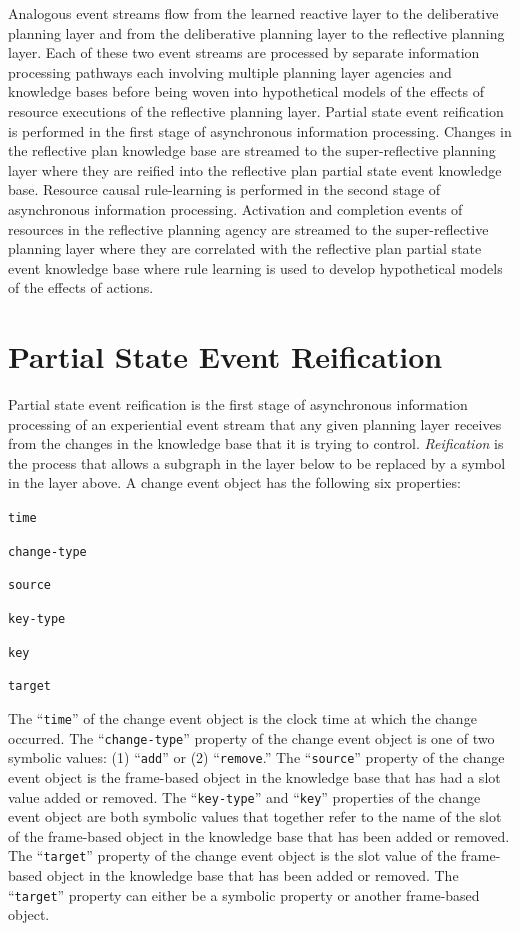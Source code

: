 Analogous event streams flow from the learned reactive layer to the
deliberative planning layer and from the deliberative planning layer
to the reflective planning layer.  Each of these two event streams are
processed by separate information processing pathways each involving
multiple planning layer agencies and knowledge bases before being
woven into hypothetical models of the effects of resource executions
of the reflective planning layer.  Partial state event reification is
performed in the first stage of asynchronous information processing.
Changes in the reflective plan knowledge base are streamed to the
super-reflective planning layer where they are reified into the
reflective plan partial state event knowledge base.  Resource causal
rule-learning is performed in the second stage of asynchronous
information processing.  Activation and completion events of resources
in the reflective planning agency are streamed to the super-reflective
planning layer where they are correlated with the reflective plan
partial state event knowledge base where rule learning is used to
develop hypothetical models of the effects of actions.

\section{Partial State Event Reification}
\label{section:partial_state_event_abstraction}

Partial state event reification is the first stage of asynchronous
information processing of an experiential event stream that any given
planning layer receives from the changes in the knowledge base that it
is trying to control.  {\emph{Reification}} is the process that allows
a subgraph in the layer below to be replaced by a symbol in the layer
above.  A change event object has the following six properties:
\begin{packed_enumerate}
\item{{\tt{time}}}
\item{{\tt{change-type}}}
\item{{\tt{source}}}
\item{{\tt{key-type}}}
\item{{\tt{key}}}
\item{{\tt{target}}}
\end{packed_enumerate}
The ``{\tt{time}}'' of the change event object is the clock time at
which the change occurred.  The ``{\tt{change-type}}'' property of the
change event object is one of two symbolic values: (1) ``{\tt{add}}''
or (2) ``{\tt{remove}}.''  The ``{\tt{source}}'' property of the
change event object is the frame-based object in the knowledge base
that has had a slot value added or removed.  The ``{\tt{key-type}}''
and ``{\tt{key}}'' properties of the change event object are both
symbolic values that together refer to the name of the slot of the
frame-based object in the knowledge base that has been added or
removed.  The ``{\tt{target}}'' property of the change event object is
the slot value of the frame-based object in the knowledge base that
has been added or removed.  The ``{\tt{target}}'' property can either
be a symbolic property or another frame-based object.

